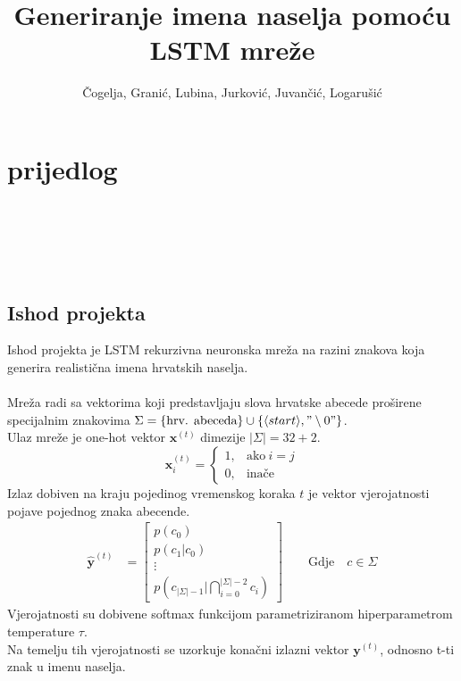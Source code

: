 \documentclass{report}
\title{Generiranje imena naselja pomoću LSTM mreže}
\author{Čogelja, Granić, Lubina, Jurković, Juvančić, Logarušić}
\begin{document}
\maketitle

\chapter*{prijedlog}
\ \\
\\
\\
\\

\section{Ishod projekta}
Ishod projekta je LSTM rekurzivna neuronska mreža na razini znakova koja generira realistična imena hrvatskih naselja.\\
\\
Mreža radi sa vektorima koji predstavljaju slova hrvatske abecede proširene specijalnim znakovima $\Sigma = \{ \text{hrv. abeceda}\} \cup \{\langle start \rangle, "\setminus 0"\}$.\\
Ulaz mreže je one-hot vektor $\mathbf{x}^{(t)}$ dimezije $\lvert \Sigma \rvert = 32 + 2$.
\begin{equation}
\mathbf{x}^{(t)}_i=
    \begin{cases}
      1, & \text{ako}\ i=j \\
      0, & \text{inače}
    \end{cases}
\end{equation}
Izlaz dobiven na kraju pojedinog vremenskog koraka $t$ je vektor vjerojatnosti pojave pojednog znaka abecende.\\
\begin{align}
    \hat{\mathbf{y}}^{(t)} &= \begin{bmatrix}
           p(c_0) \\
           p(c_1 | c_0) \\
           \vdots \\
           p(c_{\lvert \Sigma \rvert -1} | \bigcap_{i=0}^{\lvert \Sigma \rvert -2} c_i)
         \end{bmatrix}
         \quad \quad \text{Gdje} \quad c \in \Sigma
\end{align}
Vjerojatnosti su dobivene softmax funkcijom parametriziranom hiperparametrom temperature $\tau$.\\
Na temelju tih vjerojatnosti se uzorkuje konačni izlazni vektor $\mathbf{y}^{(t)}$, odnosno t-ti znak u imenu naselja.\\
\end{document}
